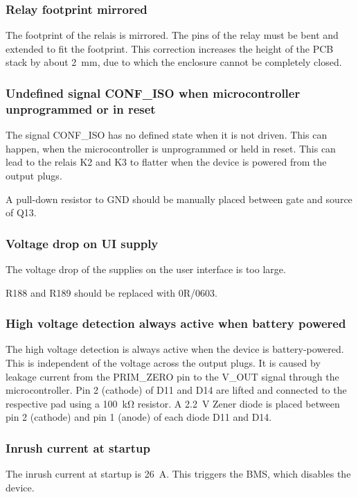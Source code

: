 \subsubsection{Relay footprint mirrored}
The footprint of the relais is mirrored. The pins of the relay must be bent and extended to fit the footprint. This correction increases the height of the PCB stack by about \qty{2}{\milli\meter}, due to which the enclosure cannot be completely closed. 

\subsubsection{Undefined signal CONF\_ISO when microcontroller unprogrammed or in reset}
The signal CONF\_ISO has no defined state when it is not driven. This can happen, when the microcontroller is unprogrammed or held in reset. This can lead to the relais K2 and K3 to flatter when the device is powered from the output plugs. 

A pull-down resistor to GND should be manually placed between gate and source of Q13. 

\subsubsection{Voltage drop on UI supply}
The voltage drop of the supplies on the user interface is too large. 

R188 and R189 should be replaced with 0R/0603. 

\subsubsection{High voltage detection always active when battery powered}
The high voltage detection is always active when the device is battery-powered. This is independent of the voltage across the output plugs. It is caused by leakage current from the PRIM\_ZERO pin to the V\_OUT signal through the microcontroller. 
Pin 2 (cathode) of D11 and D14 are lifted and connected to the respective pad using a \qty{100}{\kilo\ohm} resistor. A \qty{2.2}{\volt} Zener diode is placed between pin 2 (cathode) and pin 1 (anode) of each diode D11 and D14. 

\subsubsection{Inrush current at startup}
The inrush current at startup is \qty{26}{\ampere}. This triggers the BMS, which disables the device. 

